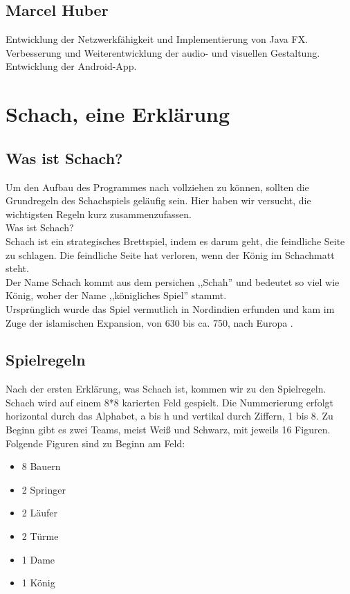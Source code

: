 \documentclass[12pt,a4paper]{article}
\begin{document}
{ \subsection{Marcel Huber}
	Entwicklung der Netzwerkfähigkeit und Implementierung von Java FX.
Verbesserung und Weiterentwicklung der audio- und visuellen Gestaltung.
Entwicklung der Android-App.


\clearpage\vfill\newpage{}

\section{Schach, eine Erklärung}
\label{SEC:CHESS}

\subsection{Was ist Schach?}
\label{SUBSEC:CHESS-EXPLAIN}
Um den Aufbau des Programmes nach vollziehen zu können, sollten die Grundregeln des Schachspiels geläufig sein. Hier haben wir versucht, die wichtigsten Regeln kurz zusammenzufassen. \\
Was ist Schach? \\
Schach ist ein strategisches Brettspiel, indem es darum geht, die feindliche Seite zu schlagen. Die feindliche Seite hat verloren, wenn der König im Schachmatt steht. \\
Der Name Schach kommt aus dem persichen ,,Schah'' und bedeutet so viel wie König, woher der Name ,,königliches Spiel'' stammt. \\
Ursprünglich wurde das Spiel vermutlich in Nordindien erfunden und kam im Zuge der islamischen Expansion, von 630 bis ca. 750, nach Europa \cite{wiki:chess}.


\subsection{Spielregeln}
\label{SUBSEC:GAMERULES}

Nach der ersten Erklärung, was Schach ist, kommen wir zu den Spielregeln.
Schach wird auf einem 8*8 karierten Feld gespielt. Die Nummerierung erfolgt horizontal durch das Alphabet, a bis h und vertikal durch Ziffern, 1 bis 8.
Zu Beginn gibt es zwei Teams, meist Weiß und Schwarz, mit jeweils 16 Figuren.
Folgende Figuren sind zu Beginn am Feld:
\begin{itemize}
	\item{8 Bauern}
	\item{2 Springer}
	\item{2 Läufer}
	\item{2 Türme}
	\item{1 Dame}
	\item{1 König}
\end{itemize}

}
\end{document}
